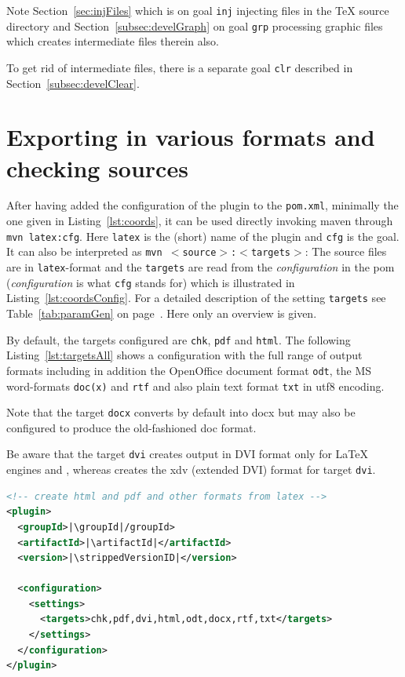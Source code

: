 Note Section~\ref{sec:injFiles}  which is on goal \texttt{inj} 
injecting files in the \TeX{} source directory and 
Section~\ref{subsec:develGraph} on goal \texttt{grp} 
processing graphic files which creates intermediate files therein also. 

To get rid of intermediate files, there is a separate goal \texttt{clr} 
described in Section~\ref{subsec:develClear}. 




\section{Exporting in various formats and checking sources}\label{sec:outputFormats}



After having added the configuration of the plugin to the \texttt{pom.xml},
minimally the one given in Listing~\ref{lst:coords},
it can be used directly invoking maven through 
\texttt{mvn latex:cfg}. 
Here \texttt{latex} is the (short) name of the plugin 
and \texttt{cfg} is the goal. 
It can also be interpreted as \texttt{mvn $<$source$>$:$<$targets$>$}: 
The source files are in \texttt{latex}-format and the \texttt{targets} 
are read from the \emph{configuration} in the pom 
(\emph{configuration} is what \texttt{cfg} stands for) 
which is illustrated in Listing~\ref{lst:coordsConfig}. 
For a detailed description of the setting \texttt{targets} 
see Table~\ref{tab:paramGen} on page~\pageref{tab:paramGen}. 
Here only an overview is given. 

By default, the targets configured are \texttt{chk}, \texttt{pdf} and \texttt{html}. 
The following Listing~\ref{lst:targetsAll} shows a configuration 
with the full range of output formats including in addition 
the OpenOffice document format \texttt{odt}, 
the MS word-formats \texttt{doc(x)} and \texttt{rtf} %
and also plain text format \texttt{txt} in utf8 encoding. 

Note that the target \texttt{docx} converts by default into \gls{docx} 
but may also be configured to produce the old-fashioned \gls{doc} format. 

Be aware that the target \texttt{dvi} creates output in DVI format 
only for \LaTeX{} engines \lualatex{} and \pdflatex{}, 
whereas \xelatex{} creates the \gls{xdv} (extended DVI) format for target \texttt{dvi}. 

\begin{lstlisting}[language=xml, basicstyle=\small,
escapechar=|,
float, captionpos=b, label={lst:targetsAll}, 
caption={Configuration with full range output formats}]
<!-- create html and pdf and other formats from latex -->
<plugin>
  <groupId>|\groupId|/groupId>
  <artifactId>|\artifactId|</artifactId>
  <version>|\strippedVersionID|</version>
	
  <configuration>
    <settings>
      <targets>chk,pdf,dvi,html,odt,docx,rtf,txt</targets>
    </settings>
  </configuration>
</plugin>
\end{lstlisting}

